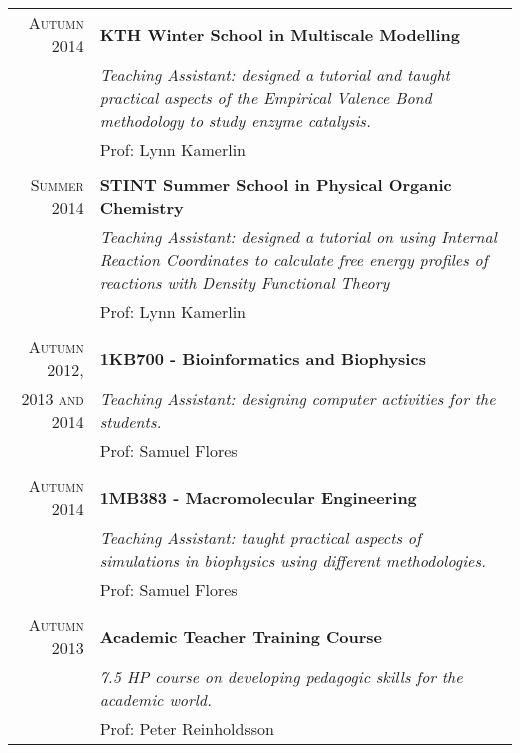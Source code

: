\documentclass[a4paper,10pt]{article} %
\begin{document}
\begin{tabular}{r|p{11.5cm}}

\textsc{Autumn 2014} & \textbf{KTH Winter School in Multiscale Modelling}\\
& \emph{Teaching Assistant: designed a tutorial and taught practical aspects of the Empirical Valence Bond methodology to study enzyme catalysis.} \\ &  Prof: Lynn Kamerlin\\
\multicolumn{2}{c}{} \\

\textsc{Summer 2014} & \textbf{STINT Summer School in Physical Organic Chemistry}\\
& \emph{Teaching Assistant: designed a tutorial on using Internal Reaction Coordinates to calculate free energy profiles of reactions with Density Functional Theory} \\ &  Prof: Lynn Kamerlin\\
\multicolumn{2}{c}{} \\

\textsc{Autumn 2012,} & \textbf{1KB700 - Bioinformatics and Biophysics}\\
\textsc{2013 and 2014} & \emph{Teaching Assistant: designing computer activities for the students.} \\ &  Prof: Samuel Flores\\
\multicolumn{2}{c}{} \\

\textsc{Autumn 2014} & \textbf{1MB383 - Macromolecular Engineering} \emph{}\\
& \emph{Teaching Assistant: taught practical aspects of simulations in biophysics using different methodologies.} \\ & Prof: Samuel Flores \\
\multicolumn{2}{c}{} \\

\textsc{Autumn 2013} & \textbf{Academic Teacher Training Course}\\
& \emph{7.5 HP course on developing pedagogic skills for the academic world.} \\ & Prof: Peter Reinholdsson \\

\end{tabular}

\end{document}
